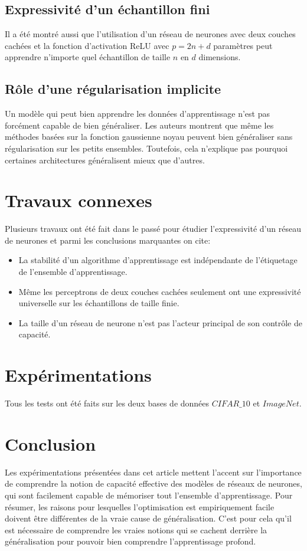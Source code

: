 \documentclass[a4paper,english,12pt, twocolumn]{article}
\begin{document}
\subsection{Expressivité d'un échantillon fini}
Il  a été montré aussi que l'utilisation d'un réseau de neurones avec deux couches cachées et la fonction d'activation ReLU avec $p=2n+d$ paramètres peut apprendre n'importe quel échantillon de taille $n$ en $d$ dimensions.

\subsection{Rôle d'une régularisation implicite}
Un modèle qui peut bien apprendre les données d'apprentissage n'est pas forcément capable de bien généraliser. Les auteurs montrent que même les méthodes basées sur la fonction gaussienne noyau peuvent bien généraliser sans régularisation sur les petits ensembles. Toutefois, cela n'explique pas pourquoi certaines architectures généralisent mieux que d'autres.

\section{Travaux connexes}
Plusieurs travaux ont été fait dans le passé pour étudier l'expressivité d'un réseau de neurones et parmi les conclusions marquantes on cite:
\begin{itemize}
	\item La stabilité d'un algorithme d'apprentissage est indépendante de l'étiquetage de l'ensemble d'apprentissage.
	\item Même les perceptrons de deux couches cachées seulement ont une expressivité universelle sur les échantillons de taille finie.
	\item La taille d'un réseau de neurone n'est pas l'acteur principal de son contrôle de capacité.
\end{itemize}

\section{Expérimentations}
Tous les tests ont été faits sur les deux bases de données $CIFAR\_10$ et $ImageNet$.

\section{Conclusion}
Les expérimentations présentées dans cet article mettent l'accent sur l'importance de comprendre la notion de capacité effective des modèles de réseaux de neurones, qui sont facilement capable de mémoriser tout l'ensemble d'apprentissage. Pour résumer, les raisons pour lesquelles l'optimisation est empiriquement facile doivent être différentes de la vraie cause de généralisation. C'est pour cela qu'il est nécessaire de comprendre les vraies notions qui se cachent derrière la généralisation pour pouvoir bien comprendre l'apprentissage profond.
\end{document}
